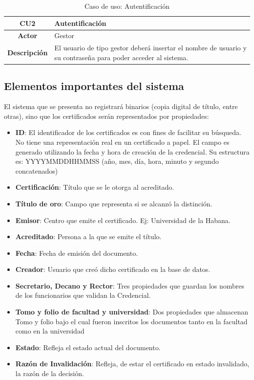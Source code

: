 \begin{table}[!h]
	\begin{center}
		\begin{tabular}{|c|p{10cm}|}
		\hline \textbf{CU2} & Autentificación \\ 
		\hline \textbf{Actor} & Gestor\\ 
		\hline \textbf{Descripción} & El usuario de tipo gestor deberá insertar el nombre de usuario y su contraseña para poder acceder al sistema.\\ 
		\hline 
		\end{tabular}
		\caption{Caso de uso: Autentificación}
		\label{tab:CU2}
	\end{center}
\end{table}

\subsection{Elementos importantes del sistema}
El sistema que se presenta no registrará binarios (copia digital de título, entre otras), sino que los certificados serán representados por propiedades:
\begin{itemize}
\item \textbf{ID}: El identificador de los certificados es con fines de facilitar su búsqueda. No tiene una representación real en un certificado a papel. El campo es generado utilizando la fecha y hora de creación de la credencial. Su estructura es: YYYYMMDDHHMMSS (año, mes, día, hora, minuto y segundo concatenados)
\item \textbf{Certificación}: Título que se le otorga al acreditado.
\item \textbf{Título de oro}: Campo que representa si se alcanzó la distinción.
\item \textbf{Emisor}: Centro que emite el certificado. Ej: Universidad de la Habana.
\item \textbf{Acreditado}: Persona a la que se emite el título.
\item \textbf{Fecha}: Fecha de emisión del documento.
\item \textbf{Creador}: Usuario que creó dicho certificado en la base de datos.
\item \textbf{Secretario, Decano y Rector}: Tres propiedades que guardan los nombres de los funcionarios que validan la Credencial.
\item \textbf{Tomo y folio de facultad y universidad}: Dos propiedades que almacenan Tomo y folio bajo el cual fueron inscritos los documentos tanto en la facultad como en la universidad
\item \textbf{Estado}: Refleja el estado actual del documento.
\item \textbf{Razón de Invalidación}: Refleja, de estar el certificado en estado invalidado, la razón de la decisión.
\end{itemize}

